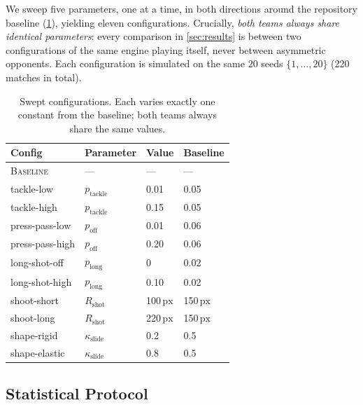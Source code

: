 \documentclass[10pt,twocolumn]{article}
\newcommand{\px}{\ensuremath{\,\mathrm{px}}}
\begin{document}
We sweep five parameters, one at a time, in both directions around the
repository baseline (\cref{tab:configs}), yielding eleven configurations.
Crucially, \emph{both teams always share identical parameters}: every
comparison in \cref{sec:results} is between two configurations of the same
engine playing itself, never between asymmetric opponents. Each
configuration is simulated on the same 20 seeds $\{1,\dots,20\}$
(220 matches in total).

\begin{table}[t]
\centering\small
\caption{Swept configurations. Each varies exactly one constant from the
baseline; both teams always share the same values.}
\label{tab:configs}
\begin{tabular}{@{}llll@{}}
\toprule
Config & Parameter & Value & Baseline \\
\midrule
\textsc{Baseline}      & ---                        & ---   & ---  \\
tackle-low             & $p_{\text{tackle}}$        & 0.01  & 0.05 \\
tackle-high            & $p_{\text{tackle}}$        & 0.15  & 0.05 \\
press-pass-low         & $p_{\text{off}}$           & 0.01  & 0.06 \\
press-pass-high        & $p_{\text{off}}$           & 0.20  & 0.06 \\
long-shot-off          & $p_{\text{long}}$          & 0     & 0.02 \\
long-shot-high         & $p_{\text{long}}$          & 0.10  & 0.02 \\
shoot-short            & $R_{\text{shot}}$          & 100\px & 150\px \\
shoot-long             & $R_{\text{shot}}$          & 220\px & 150\px \\
shape-rigid            & $\kappa_{\text{slide}}$    & 0.2   & 0.5  \\
shape-elastic          & $\kappa_{\text{slide}}$    & 0.8   & 0.5  \\
\bottomrule
\end{tabular}
\end{table}

\subsection{Statistical Protocol}\label{sec:stats}
\end{document}
